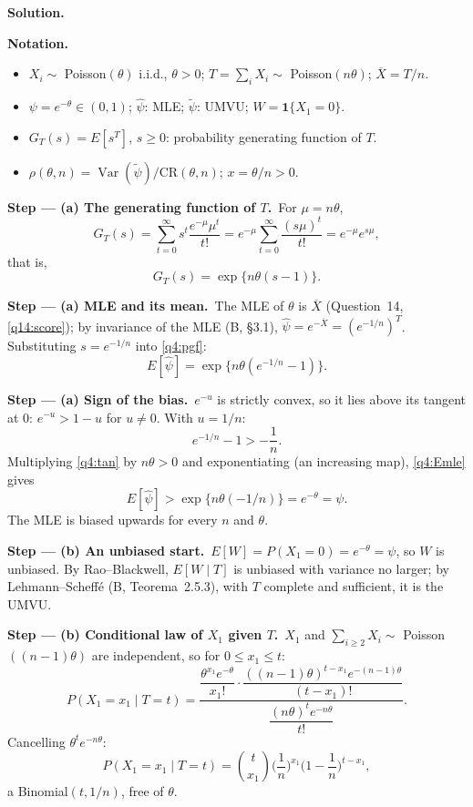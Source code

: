 \documentclass[11pt,a4paper]{article}
\numberwithin{equation}{questao}   %
\newenvironment{notacao}{\par\smallskip\noindent\textbf{Notation.}\begin{itemize}[leftmargin=1.4em,topsep=1pt,itemsep=0pt]\small}{\end{itemize}}
\newcommand{\passo}[2]{\par\smallskip\noindent\textbf{Step --- #1.}~#2}
\newcommand{\solhead}{\par\medskip\noindent{\color{blue!55!black}\rule{\linewidth}{0.3pt}}\par\noindent\textbf{Solution.}}
\newcommand{\Var}{\operatorname{Var}}
\newcommand{\1}{\mathbf{1}}
\begin{document}
\begin{sol}
\solhead
\begin{notacao}
\item $X_i\sim$ Poisson$(\theta)$ i.i.d., $\theta>0$; $T=\sum_iX_i\sim$ Poisson$(n\theta)$; $\overline X=T/n$.
\item $\psi=e^{-\theta}\in(0,1)$; $\hat\psi$: MLE; $\tilde\psi$: UMVU; $W=\1\{X_1=0\}$.
\item $G_T(s)=E[s^T]$, $s\ge0$: probability generating function of $T$.
\item $\rho(\theta,n)=\Var(\tilde\psi)/\mathrm{CR}(\theta,n)$; $x=\theta/n>0$.
\end{notacao}

\passo{(a) The generating function of $T$}{For $\mu=n\theta$,}
\[
G_T(s)=\sum_{t=0}^\infty s^t\frac{e^{-\mu}\mu^t}{t!}=e^{-\mu}\sum_{t=0}^\infty\frac{(s\mu)^t}{t!}=e^{-\mu}e^{s\mu},
\]
that is,
\begin{equation}\label{q4:pgf}
G_T(s)=\exp\{n\theta(s-1)\}.
\end{equation}

\passo{(a) MLE and its mean}{The MLE of $\theta$ is $\overline X$ (Question~14, \eqref{q14:score});
by invariance of the MLE (B, §3.1), $\hat\psi=e^{-\overline X}=(e^{-1/n})^T$. Substituting
$s=e^{-1/n}$ into \eqref{q4:pgf}:}
\begin{equation}\label{q4:Emle}
E[\hat\psi]=\exp\{n\theta(e^{-1/n}-1)\}.
\end{equation}

\passo{(a) Sign of the bias}{$e^{-u}$ is strictly convex, so it lies above its tangent at $0$:
$e^{-u}>1-u$ for $u\ne0$. With $u=1/n$:}
\begin{equation}\label{q4:tan}
e^{-1/n}-1>-\frac1n .
\end{equation}
Multiplying \eqref{q4:tan} by $n\theta>0$ and exponentiating (an increasing map), \eqref{q4:Emle}
gives
\[
E[\hat\psi]>\exp\{n\theta(-1/n)\}=e^{-\theta}=\psi .
\]
The MLE is biased upwards for every $n$ and $\theta$.

\passo{(b) An unbiased start}{$E[W]=P(X_1=0)=e^{-\theta}=\psi$, so $W$ is unbiased. By
Rao--Blackwell, $E[W\mid T]$ is unbiased with variance no larger; by Lehmann--Scheffé (B,
Teorema~2.5.3), with $T$ complete and sufficient, it is the UMVU.}

\passo{(b) Conditional law of $X_1$ given $T$}{$X_1$ and $\sum_{i\ge2}X_i\sim$ Poisson$((n-1)\theta)$
are independent, so for $0\le x_1\le t$:}
\[
P(X_1=x_1\mid T=t)=\frac{\dfrac{\theta^{x_1}e^{-\theta}}{x_1!}\cdot\dfrac{((n-1)\theta)^{t-x_1}e^{-(n-1)\theta}}{(t-x_1)!}}{\dfrac{(n\theta)^te^{-n\theta}}{t!}} .
\]
Cancelling $\theta^te^{-n\theta}$:
\begin{equation}\label{q4:bin}
P(X_1=x_1\mid T=t)=\binom{t}{x_1}\Big(\frac1n\Big)^{x_1}\Big(1-\frac1n\Big)^{t-x_1},
\end{equation}
a Binomial$(t,1/n)$, free of $\theta$.


\end{sol}
\end{document}
